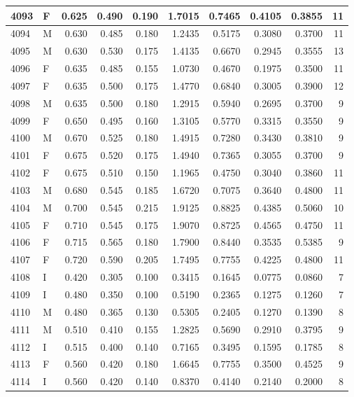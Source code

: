\documentclass[9pt,twocolumn,twoside,]{pnas-new}
\begin{document}
\begin{tabular}{l|l|r|r|r|r|r|r|r|r}
\hline
4093 & F & 0.625 & 0.490 & 0.190 & 1.7015 & 0.7465 & 0.4105 & 0.3855 & 11\\
\hline
4094 & M & 0.630 & 0.485 & 0.180 & 1.2435 & 0.5175 & 0.3080 & 0.3700 & 11\\
\hline
4095 & M & 0.630 & 0.530 & 0.175 & 1.4135 & 0.6670 & 0.2945 & 0.3555 & 13\\
\hline
4096 & F & 0.635 & 0.485 & 0.155 & 1.0730 & 0.4670 & 0.1975 & 0.3500 & 11\\
\hline
4097 & F & 0.635 & 0.500 & 0.175 & 1.4770 & 0.6840 & 0.3005 & 0.3900 & 12\\
\hline
4098 & M & 0.635 & 0.500 & 0.180 & 1.2915 & 0.5940 & 0.2695 & 0.3700 & 9\\
\hline
4099 & F & 0.650 & 0.495 & 0.160 & 1.3105 & 0.5770 & 0.3315 & 0.3550 & 9\\
\hline
4100 & M & 0.670 & 0.525 & 0.180 & 1.4915 & 0.7280 & 0.3430 & 0.3810 & 9\\
\hline
4101 & F & 0.675 & 0.520 & 0.175 & 1.4940 & 0.7365 & 0.3055 & 0.3700 & 9\\
\hline
4102 & F & 0.675 & 0.510 & 0.150 & 1.1965 & 0.4750 & 0.3040 & 0.3860 & 11\\
\hline
4103 & M & 0.680 & 0.545 & 0.185 & 1.6720 & 0.7075 & 0.3640 & 0.4800 & 11\\
\hline
4104 & M & 0.700 & 0.545 & 0.215 & 1.9125 & 0.8825 & 0.4385 & 0.5060 & 10\\
\hline
4105 & F & 0.710 & 0.545 & 0.175 & 1.9070 & 0.8725 & 0.4565 & 0.4750 & 11\\
\hline
4106 & F & 0.715 & 0.565 & 0.180 & 1.7900 & 0.8440 & 0.3535 & 0.5385 & 9\\
\hline
4107 & F & 0.720 & 0.590 & 0.205 & 1.7495 & 0.7755 & 0.4225 & 0.4800 & 11\\
\hline
4108 & I & 0.420 & 0.305 & 0.100 & 0.3415 & 0.1645 & 0.0775 & 0.0860 & 7\\
\hline
4109 & I & 0.480 & 0.350 & 0.100 & 0.5190 & 0.2365 & 0.1275 & 0.1260 & 7\\
\hline
4110 & M & 0.480 & 0.365 & 0.130 & 0.5305 & 0.2405 & 0.1270 & 0.1390 & 8\\
\hline
4111 & M & 0.510 & 0.410 & 0.155 & 1.2825 & 0.5690 & 0.2910 & 0.3795 & 9\\
\hline
4112 & I & 0.515 & 0.400 & 0.140 & 0.7165 & 0.3495 & 0.1595 & 0.1785 & 8\\
\hline
4113 & F & 0.560 & 0.420 & 0.180 & 1.6645 & 0.7755 & 0.3500 & 0.4525 & 9\\
\hline
4114 & I & 0.560 & 0.420 & 0.140 & 0.8370 & 0.4140 & 0.2140 & 0.2000 & 8\\

\end{tabular}
\end{document}
